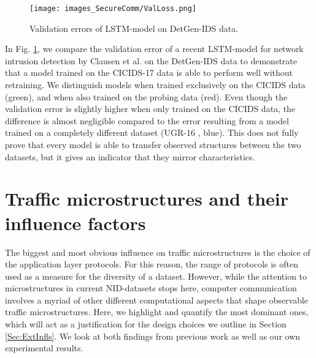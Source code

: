 \begin{figure}
\centering
\texttt{[image: images\_SecureComm/ValLoss.png]}
\caption{Validation errors of LSTM-model \cite{henryLSTM} on DetGen-IDS data.}\label{Fig:ValLoss}
\end{figure}

In Fig. \ref{Fig:ValLoss}, we compare the validation error of a recent LSTM-model for network intrusion detection by Clausen et al. \cite{henryLSTM} on the DetGen-IDS data to demonstrate that a model trained on the CICIDS-17 data is able to perform well without retraining. We distinguish models when trained exclusively on the CICIDS data (green), and when also trained on the probing data (red). 
Even though the validation error is slightly higher when only trained on the CICIDS data, the difference is almost negligible compared to the error resulting from a model trained on a completely different dataset (UGR-16 \cite{macia2018ugr}, blue). This does not fully prove that every model is able to transfer observed structures between the two datasets, but it gives an indicator that they mirror characteristics.








\section{Traffic microstructures and their influence factors}\label{Sec:DetGenMicro}

The biggest and most obvious influence on traffic microstructures is the choice of the application layer protocols. For this reason, the range of protocols is often used as a measure for the diversity of a dataset. However, while the attention to microstructures in current NID-datasets stops here, computer communication involves a myriad of other different computational aspects that shape observable traffic microstructures. Here, we highlight and quantify the most dominant ones, which will act as a justification for the design choices we outline in Section \ref{Sec:ExtInfls}. We look at both findings from previous work as well as our own experimental results.

